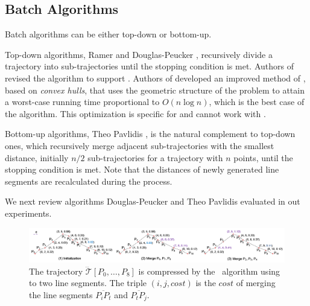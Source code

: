 \subsection{Batch Algorithms}
Batch algorithms can be either top-down or bottom-up.

Top-down algorithms, \eg Ramer \cite{Ramer:Split} and Douglas-Peucker \cite{Douglas:Peucker}, recursively divide a trajectory into sub-trajectories until the stopping condition is met.
Authors of \cite{Meratnia:Spatiotemporal} revised the \dpa algorithm to support \sed.
Authors of \cite{Hershberger:Speeding} developed an improved method of \dpa, based on \emph{convex hulls}, that uses the geometric structure of the problem to attain a worst-case running time proportional to $O(n\log n)$, which is the best case of the \dpa algorithm. {This optimization is specific for \ped and cannot work with \sed.}

Bottom-up algorithms, \eg Theo Pavlidis \cite{Pavlidis:Segment}, is the natural complement to top-down ones, which recursively merge adjacent sub-trajectories with the smallest distance, initially $n/2$  sub-trajectories for a trajectory with $n$ points, until the stopping condition is met. Note that the distances of newly generated line segments are recalculated during the process.

We next review algorithms Douglas-Peucker and Theo Pavlidis evaluated in out experiments.

\begin{figure}[tb!]
	\centering
	\includegraphics[scale=0.55]{Figures/Fig-Pavlidis.png}
	\vspace{-5.5ex}
	\caption{\small The trajectory $\dddot{\mathcal{T}}[P_0, \ldots, P_{8}]$ is compressed by the \pavlidis~algorithm using \ped to two line segments. The triple $(i, j, cost)$ is the $cost$ of merging the line segments $\overline{P_iP_t}$ and $\overline{P_tP_j}$.} %
	\vspace{-2.5ex}
	\label{fig:pavlidis}
\end{figure}

\vspace{-1ex}
